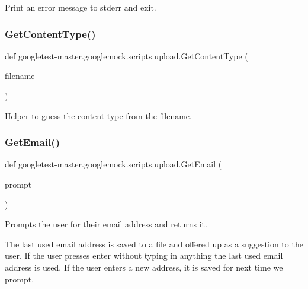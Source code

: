 \begin{DoxyVerb}Print an error message to stderr and exit.\end{DoxyVerb}
 \mbox{\label{namespacegoogletest-master_1_1googlemock_1_1scripts_1_1upload_a290c1f445b5c84a6158ea7f0d12c8948}} 
\subsubsection{\texorpdfstring{GetContentType()}{GetContentType()}}
{\footnotesize\ttfamily def googletest-\/master.\+googlemock.\+scripts.\+upload.\+Get\+Content\+Type (\begin{DoxyParamCaption}\item[{}]{filename }\end{DoxyParamCaption})}

\begin{DoxyVerb}Helper to guess the content-type from the filename.\end{DoxyVerb}
 \mbox{\label{namespacegoogletest-master_1_1googlemock_1_1scripts_1_1upload_aaff3f0ee04efd2f077d6f89ce98c0661}} 
\subsubsection{\texorpdfstring{GetEmail()}{GetEmail()}}
{\footnotesize\ttfamily def googletest-\/master.\+googlemock.\+scripts.\+upload.\+Get\+Email (\begin{DoxyParamCaption}\item[{}]{prompt }\end{DoxyParamCaption})}

\begin{DoxyVerb}Prompts the user for their email address and returns it.

The last used email address is saved to a file and offered up as a suggestion
to the user. If the user presses enter without typing in anything the last
used email address is used. If the user enters a new address, it is saved
for next time we prompt.\end{DoxyVerb}
 \mbox{\label{namespacegoogletest-master_1_1googlemock_1_1scripts_1_1upload_a2b6e6df75101a580e275ed816ebba25d}} 
